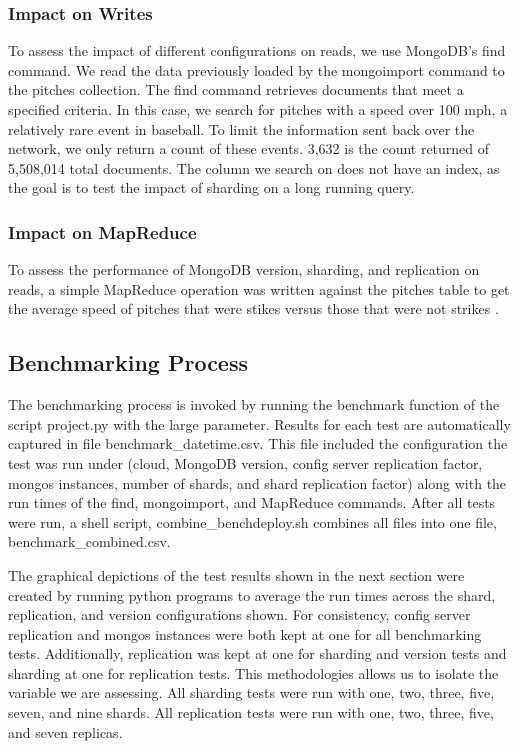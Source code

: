\documentclass[9pt,twocolumn,twoside]{../../styles/osajnl}
\begin{document}
\subsubsection{Impact on Writes}

To assess the impact of different configurations on reads, we use MongoDB's find command.  We read the data previously loaded by the mongoimport command to the pitches collection.  The find command retrieves documents that meet a specified criteria.  In this case, we search for pitches with a speed over 100 mph, a relatively rare event in baseball.  To limit the information sent back over the network, we only return a count of these events.  3,632 is the count returned of 5,508,014 total documents.  The column we search on does not have an index, as the goal is to test the impact of sharding on a long running query.

\subsubsection{Impact on MapReduce}

To assess the performance of MongoDB version, sharding, and replication on reads, a simple MapReduce operation was written against the pitches table to get the average speed of pitches that were stikes versus those that were not strikes \cite{www-mapreduceEx} \cite{www-mapreduce}.


\subsection{Benchmarking Process}

The benchmarking process is invoked by running the benchmark function of the script project.py with the large parameter.  Results for each test are automatically captured in file benchmark\_datetime.csv.  This file included the configuration the test was run under (cloud, MongoDB version, config server replication factor, mongos instances, number of shards, and shard replication factor) along with the run times of the find, mongoimport, and MapReduce commands.  After all tests were run, a shell script, combine\_benchdeploy.sh combines all files into one file, benchmark\_combined.csv.

The graphical depictions of the test results shown in the next section were created by running python programs to average the run times across the shard, replication, and version configurations shown.  For consistency, config server replication and mongos instances were both kept at one for all benchmarking tests.  Additionally, replication was kept at one for sharding and version tests and sharding at one for replication tests.  This methodologies allows us to isolate the variable we are assessing.  All sharding tests were run with one, two, three, five, seven, and nine shards.  All replication tests were run with one, two, three, five, and seven replicas.
\end{document}
